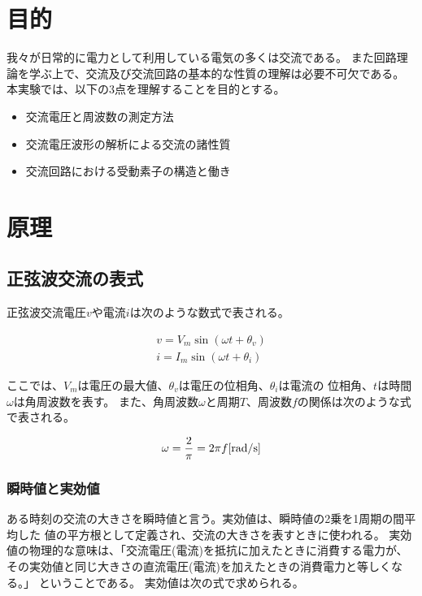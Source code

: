 \documentclass[dvipdfmx]{jsarticle}
\begin{document}
\section{目的}

我々が日常的に電力として利用している電気の多くは交流である。
また回路理論を学ぶ上で、交流及び交流回路の基本的な性質の理解は必要不可欠である。
本実験では、以下の3点を理解することを目的とする。

\begin{itemize}
\item
  交流電圧と周波数の測定方法
\item
  交流電圧波形の解析による交流の諸性質
\item
  交流回路における受動素子の構造と働き
\end{itemize}

\section{原理}

\subsection{正弦波交流の表式}

正弦波交流電圧\(v\)や電流\(i\)は次のような数式で表される。

\begin{eqnarray}
v = V_m\sin(\omega t + \theta_v)\\
i = I_m\sin(\omega t + \theta_i)
\end{eqnarray}

ここでは、\(V_m\)は電圧の最大値、\(\theta_v\)は電圧の位相角、\(\theta_i\)は電流の
位相角、\(t\)は時間\(\omega\)は角周波数を表す。
また、角周波数\(\omega\)と周期\(T\)、周波数\(f\)の関係は次のような式で表される。

\begin{equation}
\omega = \frac{2}{\pi} = 2\pi f[\rm rad/s]
\end{equation}

\subsubsection{瞬時値と実効値}

ある時刻の交流の大きさを瞬時値と言う。実効値は、瞬時値の2乗を1周期の間平均した
値の平方根として定義され、交流の大きさを表すときに使われる。
実効値の物理的な意味は、「交流電圧(電流)を抵抗に加えたときに消費する電力が、
その実効値と同じ大きさの直流電圧(電流)を加えたときの消費電力と等しくなる。」
ということである。 実効値は次の式で求められる。
\end{document}
